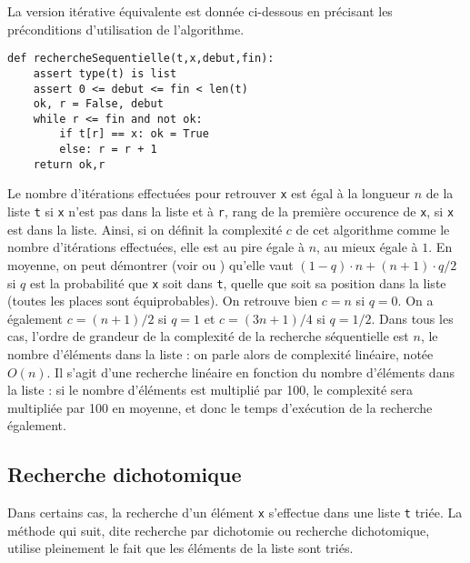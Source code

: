 La version itérative équivalente est donnée ci-dessous en précisant les préconditions
d'utilisation de l'algorithme.
\begin{lstlisting}[title={\bf Recherche séquentielle}]
def rechercheSequentielle(t,x,debut,fin):
    assert type(t) is list
    assert 0 <= debut <= fin < len(t)
    ok, r = False, debut
    while r <= fin and not ok:
        if t[r] == x: ok = True
        else: r = r + 1
    return ok,r
\end{lstlisting}

Le nombre d'itérations effectuées pour retrouver {\tt x} est égal
à la longueur $n$ de la liste {\tt t} si {\tt x} n'est pas dans la liste
et à {\tt r}, rang de la première occurence de {\tt x}, si {\tt x} est dans la liste.
Ainsi, si on définit la complexité $c$ de cet algorithme comme le nombre d'itérations
effectuées, elle est au pire égale à $n$, au mieux égale à $1$. En moyenne, on peut
démontrer (voir \cite{froidevaux} ou \cite{knuth})\label{cite:knuth1} qu'elle vaut $(1-q)\cdot n + (n+1)\cdot q/2$
si $q$ est la probabilité que {\tt x} soit dans {\tt t}, quelle que soit sa position dans la liste 
(toutes les places sont équiprobables). 
On retrouve bien
$c = n$ si $q = 0$. On a également $c = (n+1)/2$ si $q = 1$ et $c=(3n+1)/4$ si $q = 1/2$.
Dans tous les cas, l'ordre de grandeur de la complexité de la recherche séquentielle
est $n$, le nombre d'éléments dans la liste : on parle alors de complexité linéaire, 
notée $O(n)$. 
Il s'agit d'une recherche linéaire
en fonction du nombre d'éléments dans la liste : si le nombre d'éléments est multiplié par 100,
le complexité sera multipliée par 100 en moyenne, et donc le temps d'exécution de la 
recherche également.

\subsection{Recherche dichotomique}\label{sub:rechercheDichotomique}

Dans certains cas, la recherche d'un élément {\tt x} s'effectue dans une liste {\tt t}
triée. 
La méthode qui suit, dite recherche par dichotomie ou recherche dichotomique,
utilise pleinement le fait que les éléments de la liste sont triés.

